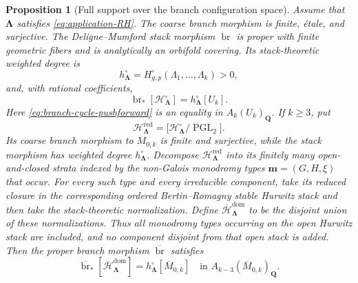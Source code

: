 \documentclass[11pt]{amsart}
\theoremstyle{plain}
\newtheorem{proposition}[theorem]{Proposition}
\theoremstyle{definition}
\numberwithin{equation}{section}
\begin{document}
\begin{proposition}[Full support over the branch configuration space]
\label{prop:branch-map-full-support}
Assume that $\boldsymbol\Lambda$ satisfies
\eqref{eq:application-RH}.  The coarse branch morphism is finite, \'etale,
and surjective.  The Deligne--Mumford stack morphism
$\operatorname{br}$ is proper with finite geometric fibers and is
analytically an orbifold covering.  Its stack-theoretic weighted degree is
\[
 h^\circ_{\boldsymbol\Lambda}
 =H^\circ_{g,p}(\Lambda_1,\ldots,\Lambda_k)>0,
\]
and, with rational coefficients,
\begin{equation}\label{eq:branch-cycle-pushforward}
 \operatorname{br}_*[\mathcal H^\circ_{\boldsymbol\Lambda}]
 =h^\circ_{\boldsymbol\Lambda}[U_k].
\end{equation}
Here \eqref{eq:branch-cycle-pushforward} is an equality in
$A_k(U_k)_{\mathbf Q}$.  If $k\geq3$, put
\[
 \mathcal H^{\mathrm{red}}_{\boldsymbol\Lambda}
 =\bigl[\mathcal H^\circ_{\boldsymbol\Lambda}/
        \operatorname{PGL}_2\bigr].
\]
Its coarse branch morphism to $M_{0,k}$ is finite and surjective, while the
stack morphism has weighted degree $h^\circ_{\boldsymbol\Lambda}$.
Decompose $\mathcal H^{\mathrm{red}}_{\boldsymbol\Lambda}$ into its
finitely many open-and-closed strata indexed by the non-Galois monodromy
types $\mathbf m=(G,H,\xi)$ that occur.  For every such type and every
irreducible component, take its reduced closure in the corresponding
ordered Bertin--Romagny stable Hurwitz stack and then take the
stack-theoretic normalization.  Define
$\overline{\mathcal H}^{\mathrm{dom}}_{\boldsymbol\Lambda}$ to be the
disjoint union of these normalizations.  Thus all monodromy types occurring
on the open Hurwitz stack are included, and no component disjoint from that
open stack is added.  Then the proper branch morphism
$\overline{\operatorname{br}}$ satisfies
\begin{equation}\label{eq:compactified-branch-cycle}
 \overline{\operatorname{br}}_*
 [\overline{\mathcal H}^{\mathrm{dom}}_{\boldsymbol\Lambda}]
 =h^\circ_{\boldsymbol\Lambda}[\overline M_{0,k}]
 \quad\text{in }A_{k-3}(\overline M_{0,k})_{\mathbf Q}.
\end{equation}
\end{proposition}
\end{document}
